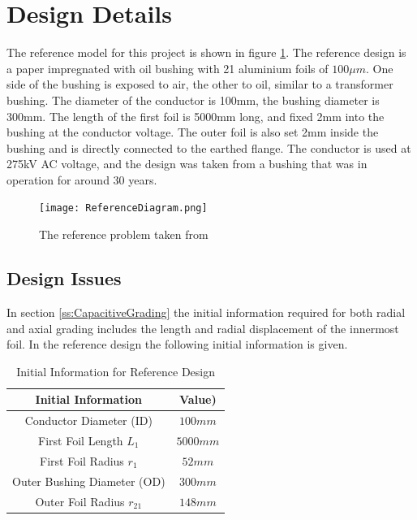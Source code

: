 
\section{Design Details}
The reference model for this project is shown in figure \ref{figure:refproblem}. 
The reference design is a paper impregnated with oil bushing with 21 aluminium foils of $100\mu m$.
One side of the bushing is exposed to air, the other to oil, similar to a transformer bushing.
The diameter of the conductor is 100mm, the bushing diameter is 300mm.
The length of the first foil is 5000mm long, and fixed 2mm into the bushing at the conductor voltage.
The outer foil is also set 2mm inside the bushing and is directly connected to the earthed flange.
The conductor is used at 275kV AC voltage, and the design was taken from a bushing that was in operation for around 30 years.
\begin{figure}[!h]
   \centering
   \texttt{[image: ReferenceDiagram.png]}
   \caption{The reference problem taken from \cite{Chen14}}
   \label{figure:refproblem}
\end{figure}

\subsection{Design Issues} \label{Section:Design Issues}
In section \ref{ss:CapacitiveGrading} the initial information required for both radial and axial grading includes the length and radial displacement of the innermost foil.
In the reference design the following initial information is given.

\begin{table}[!htb]
\caption{Initial Information for Reference Design}
\label{table:initinfo}
\begin{center}
\begin{tabular}{cc}
\toprule
\textbf{Initial Information} & \textbf{Value)} \\ \toprule
Conductor Diameter (ID) & $100mm$ \\
First Foil Length $L_1$ & $5000mm$ \\
First Foil Radius $r_1$&$52mm$ \\
Outer Bushing Diameter (OD) & $300mm$\\
Outer Foil Radius $r_21$ & $148mm$\\
\bottomrule
\end{tabular}
\end{center}
\end{table} 

